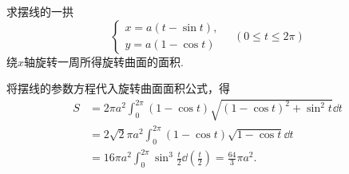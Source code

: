 \begin{example}
求摆线的一拱\[
	\left\{ \begin{array}{l}
		x = a (t - \sin t), \\
		y = a (1 - \cos t)
	\end{array} \right.
	\quad(0 \leq t \leq 2\pi)
\]绕\(x\)轴旋转一周所得旋转曲面的面积.
\begin{solution}
将摆线的参数方程代入旋转曲面面积公式，得\begin{align*}
	S &= 2\pi a^2 \int_0^{2\pi} (1-\cos t) \sqrt{(1-\cos t)^2 + \sin^2 t} \dd{t} \\
	&= 2\sqrt2 \pi a^2 \int_0^{2\pi} (1-\cos t) \sqrt{1-\cos t} \dd{t} \\
	&= 16\pi a^2 \int_0^{2\pi} \sin^3 \frac{t}{2} \dd(\frac{t}{2})
	= \frac{64}3 \pi a^2.
\end{align*}
\end{solution}
\end{example}
